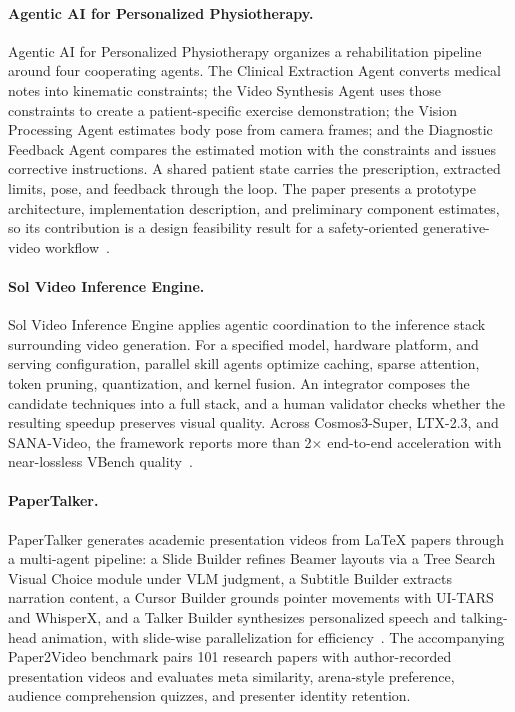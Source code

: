 \paragraph{Agentic AI for Personalized Physiotherapy.}
Agentic AI for Personalized Physiotherapy organizes a rehabilitation pipeline around four cooperating agents. The Clinical Extraction Agent converts medical notes into kinematic constraints; the Video Synthesis Agent uses those constraints to create a patient-specific exercise demonstration; the Vision Processing Agent estimates body pose from camera frames; and the Diagnostic Feedback Agent compares the estimated motion with the constraints and issues corrective instructions. A shared patient state carries the prescription, extracted limits, pose, and feedback through the loop. The paper presents a prototype architecture, implementation description, and preliminary component estimates, so its contribution is a design feasibility result for a safety-oriented generative-video workflow~\cite{avg260421154}.

\paragraph{Sol Video Inference Engine.}
Sol Video Inference Engine applies agentic coordination to the inference stack surrounding video generation. For a specified model, hardware platform, and serving configuration, parallel skill agents optimize caching, sparse attention, token pruning, quantization, and kernel fusion. An integrator composes the candidate techniques into a full stack, and a human validator checks whether the resulting speedup preserves visual quality. Across Cosmos3-Super, LTX-2.3, and SANA-Video, the framework reports more than 2$\times$ end-to-end acceleration with near-lossless VBench quality~\cite{avg260623743}.

\paragraph{PaperTalker.}
PaperTalker generates academic presentation videos from LaTeX papers through a multi-agent pipeline: a Slide Builder refines Beamer layouts via a Tree Search Visual Choice module under VLM judgment, a Subtitle Builder extracts narration content, a Cursor Builder grounds pointer movements with UI-TARS and WhisperX, and a Talker Builder synthesizes personalized speech and talking-head animation, with slide-wise parallelization for efficiency~\cite{avg251005096}. The accompanying Paper2Video benchmark pairs 101 research papers with author-recorded presentation videos and evaluates meta similarity, arena-style preference, audience comprehension quizzes, and presenter identity retention.
